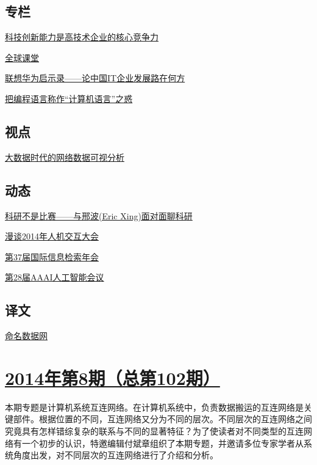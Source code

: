 \documentclass[a4paper]{article}
\begin{document}
\subsection{专栏}
\href{http://history.ccf.org.cn/resources/1190201776262/2014/09/15/9.pdf}{科技创新能力是高技术企业的核心竞争力}

\href{http://history.ccf.org.cn/resources/1190201776262/2014/09/15/11.pdf}{全球课堂}

\href{http://history.ccf.org.cn/resources/1190201776262/2014/09/15/8.pdf}{联想华为启示录——论中国IT企业发展路在何方}

\href{http://history.ccf.org.cn/resources/1190201776262/2014/09/15/10.pdf}{把编程语言称作“计算机语言”之惑}

\subsection{视点}
\href{http://history.ccf.org.cn/resources/1190201776262/2014/09/15/12.pdf}{大数据时代的网络数据可视分析}

\subsection{动态}
\href{http://history.ccf.org.cn/resources/1190201776262/2014/09/15/13.pdf}{科研不是比赛——与邢波(Eric Xing)面对面聊科研}

\href{http://history.ccf.org.cn/resources/1190201776262/2014/09/15/14.pdf}{漫谈2014年人机交互大会}

\href{http://history.ccf.org.cn/resources/1190201776262/2014/09/15/15.pdf}{第37届国际信息检索年会}

\href{http://history.ccf.org.cn/resources/1190201776262/2014/09/15/16.pdf}{第28届AAAI人工智能会议}

\subsection{译文}
\href{http://history.ccf.org.cn/resources/1190201776262/2014/09/15/17.pdf}{命名数据网}


\section{\href{http://history.ccf.org.cn/sites/ccf/jsjtbbd.jsp?contentId=2815747243183}{\textbf{2014年第8期（总第102期）}}}
本期专题是计算机系统互连网络。在计算机系统中，负责数据搬运的互连网络是关键部件。根据位置的不同，互连网络又分为不同的层次。不同层次的互连网络之间究竟具有怎样错综复杂的联系与不同的显著特征？为了使读者对不同类型的互连网络有一个初步的认识，特邀编辑付斌章组织了本期专题，并邀请多位专家学者从系统角度出发，对不同层次的互连网络进行了介绍和分析。
\end{document}
